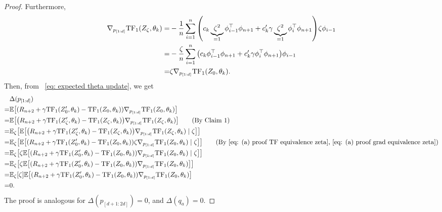 \documentclass{article}
\newcommand{\explain}[1]{\tag*{(#1)}}
\newcommand{\E}{\mathbb{E}}
\newcommand{\tf}{\text{TF}}
\begin{document}
\begin{proof}
Furthermore,
\begin{align}
    \nabla_{p_{[1:d]}} \tf_1(Z_\zeta, \theta_k)
    =& -\frac{1}{n}\sum_{i=1}^n \qty( c_k \underbrace{\zeta^2}_{=1} \phi_{i-1}^\top \phi_{n+1} + c'_k \gamma \underbrace{\zeta^2}_{=1} \phi_{i}^\top \phi_{n+1})\zeta \phi_{i-1} \\
    =& -\frac{\zeta}{n}\sum_{i=1}^n \qty( c_k \phi_{i-1}^\top \phi_{n+1} + c'_k \gamma \phi_{i}^\top \phi_{n+1})\phi_{i-1}\\
    =& \zeta \nabla_{p_{[1:d]}} \tf_1(Z_0, \theta_k).\label{eq: (a) proof grad equivalence zeta}
\end{align}
Then, from ~\eqref{eq: expected theta update}, we get
\begin{align}
    &\Delta (p_{[1:d]}) \\
    =& \E\qty[\qty(R_{n+2} + \gamma\tf_1(Z_0', \theta_k) - \tf_1 (Z_0, \theta_k))\nabla_{p_{[1:d]}}\tf_1(Z_0, \theta_k)] \\
    =& \E\qty[\qty(R_{n+2} + \gamma\tf_1(Z_\zeta', \theta_k) - \tf_1 (Z_\zeta, \theta_k))\nabla_{p_{[1:d]}}\tf_1(Z_\zeta, \theta_k)] \explain{By Claim 1}\\
    =& \E_\zeta\qty[\E\qty[\qty(R_{n+2} + \gamma\tf_1(Z_\zeta', \theta_k) - \tf_1 (Z_\zeta, \theta_k))\nabla_{p_{[1:d]}}\tf_1(Z_\zeta, \theta_k) \mid \zeta ]] \\
    =& \E_\zeta\qty[\E\qty[\qty(R_{n+2} + \gamma\tf_1(Z_0', \theta_k) - \tf_1 (Z_0, \theta_k))\zeta\nabla_{p_{[1:d]}}\tf_1(Z_0, \theta_k) \mid \zeta ]] \explain{By~\eqref{eq: (a) proof TF equivalence zeta},~\eqref{eq: (a) proof grad equivalence zeta}}\\
    =& \E_\zeta\qty[\zeta\E\qty[\qty(R_{n+2} + \gamma\tf_1(Z_0', \theta_k) - \tf_1 (Z_0, \theta_k)) \nabla_{p_{[1:d]}}\tf_1(Z_0, \theta_k) \mid \zeta ]] \\
    =& \E_\zeta\qty[\zeta\E\qty[\qty(R_{n+2} + \gamma\tf_1(Z_0', \theta_k) - \tf_1 (Z_0, \theta_k)) \nabla_{p_{[1:d]}}\tf_1(Z_0, \theta_k)]] \\
    =& \E_\zeta\qty[\zeta]\E\qty[\qty(R_{n+2} + \gamma\tf_1(Z_0', \theta_k) - \tf_1 (Z_0, \theta_k)) \nabla_{p_{[1:d]}}\tf_1(Z_0, \theta_k)] \\
    =& 0.
\end{align}
The proof is analogous for $\Delta(p_{[d+1:2d]}) = 0$, and $\Delta (q_a) = 0$.



\end{proof}
\end{document}
